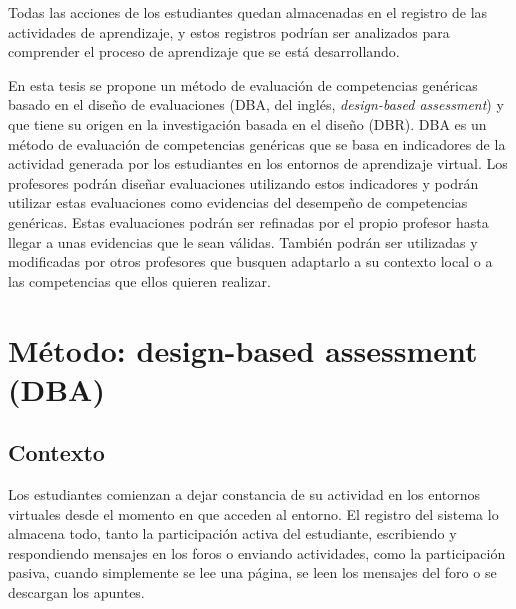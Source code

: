 Todas las acciones de los estudiantes quedan almacenadas en el registro de las actividades de aprendizaje, y estos registros podrían ser analizados para comprender el proceso de aprendizaje que se está desarrollando. %

En esta tesis se propone un método de evaluación de competencias genéricas basado en el diseño de evaluaciones (DBA, del inglés, \emph{design-based assessment}) y que tiene su origen en la investigación basada en el diseño (DBR). DBA es un método de evaluación de competencias genéricas que se basa en indicadores de la actividad generada por los estudiantes en los entornos de aprendizaje virtual. Los profesores podrán diseñar evaluaciones utilizando estos indicadores y podrán utilizar estas evaluaciones como evidencias del desempeño de competencias genéricas. Estas evaluaciones podrán ser refinadas por el propio profesor hasta llegar a unas evidencias que le sean válidas. También podrán ser utilizadas y modificadas por otros profesores que busquen adaptarlo a su contexto local o a las competencias que ellos quieren realizar. 



\section{Método: design-based assessment (DBA)}

\subsection{Contexto}

Los estudiantes comienzan a dejar constancia de su actividad en los entornos virtuales desde el momento en que acceden al entorno. El registro del sistema lo almacena todo, tanto la participación activa del estudiante, escribiendo y respondiendo mensajes en los foros o enviando actividades, como la participación pasiva, cuando simplemente se lee una página, se leen los mensajes del foro o se descargan los apuntes. 

